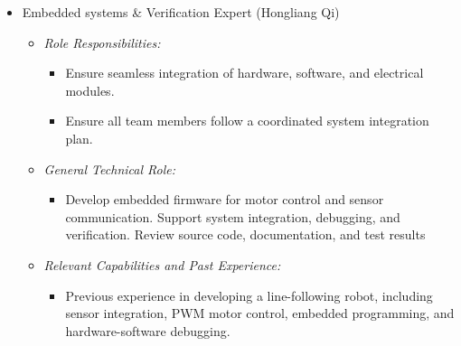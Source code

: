 \documentclass{article}
\begin{document}
\begin{itemize}
\begin{itemize}
    	\item \textit{General Technical Role:}
    	\begin{itemize}
    		\item Assist with design and implementation of software architecture for robot autonomy 
    		\item Design of simulation environment to prototype and validate approach. 
    	\end{itemize}
    	
    	\item \textit{Relevant Capabilities and Past Experience:}
    	\begin{itemize}
    		\item 16 months of cumulative research experience in robotics, focusing on, safe local navigation, evolutionary computing and optimal sensor placement. 
    		\item 4 months of industry experience at stealth startup working on deployment of computer vision system for anomaly detection in agricultural crops. 
    	\end{itemize}
    \end{itemize}
    
    \item Embedded systems \& Verification Expert  (Hongliang Qi) \label{role:embedded_expert}
    \begin{itemize}
    	\item \textit{Role Responsibilities:}
    	\begin{itemize}
    		\item Ensure seamless integration of hardware, software, and electrical modules.
    		\item Ensure all team members follow a coordinated system integration plan. 
    	\end{itemize}
    	
    	\item \textit{General Technical Role:}
    	\begin{itemize}
    		\item Develop embedded firmware for motor control and sensor communication. Support system integration, debugging, and verification. Review source code, documentation, and test results
    	\end{itemize}
    	
    	\item \textit{Relevant Capabilities and Past Experience:}
    	\begin{itemize}
    		\item Previous experience in developing a line-following robot, including sensor integration, PWM motor control, embedded programming, and hardware-software debugging. 
    	\end{itemize}	
    	

\end{itemize}
\end{itemize}
\end{document}
